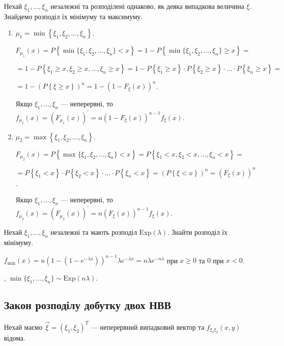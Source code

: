 Нехай $\xi_1, ..., \xi_n$ незалежні та розподілені однаково, як деяка випадкова величина $\xi$.
Знайдемо розподіл їх мінімуму та максимуму.
\begin{enumerate}
    \item $\mu_1 = \min\left\{\xi_1, \xi_2, ..., \xi_n\right\}$.

    $F_{\mu_1} (x) = P \left\{ \min\{\xi_1, \xi_2, ..., \xi_n\} < x \right\} =
    1 - P \left\{ \min\{\xi_1, \xi_2, ..., \xi_n\} \geq x \right\} =$

    $ = 1 - P \left\{ \xi_1 \geq x, \xi_2 \geq x, ..., \xi_n \geq x \right\} = 
    1 - P\left\{ \xi_1 \geq x\right\} \cdot P\left\{ \xi_2 \geq x\right\} \cdot ... \cdot P\left\{ \xi_n \geq x\right\} = $
    
    $ = 1 - (P\left\{ \xi \geq x\right\})^n = 1 - (1- F_\xi (x))^n$.

    Якщо $\xi_1, ..., \xi_n$ --- неперервні, то $f_{\mu_1} (x) = \left( F_{\mu_1} (x)\right)^\prime = n (1- F_\xi (x))^{n-1} f_\xi(x)$.
    \item $\mu_2 = \max\left\{\xi_1, \xi_2, ..., \xi_n\right\}$.

    $F_{\mu_2} (x) = P \left\{ \max\{\xi_1, \xi_2, ..., \xi_n\} < x \right\} =
    P \left\{ \xi_1 < x, \xi_2 < x, ..., \xi_n < x \right\} = $

    $ = P\left\{ \xi_1 < x\right\} \cdot P\left\{ \xi_2 < x\right\} \cdot ... \cdot P\left\{ \xi_n < x\right\} =
    (P\left\{ \xi < x\right\})^n = (F_\xi (x))^n$.

    Якщо $\xi_1, ..., \xi_n$ --- неперервні, то $f_{\mu_2} (x) = \left( F_{\mu_2} (x)\right)^\prime = n (F_\xi (x))^{n-1} f_\xi(x)$.
\end{enumerate}

\begin{example}
    Нехай $\xi_1, ..., \xi_n$ незалежні та мають розподіл $\mathrm{Exp}(\lambda)$. Знайти розподіл їх мінімуму.

    \noindent$f_{\min}(x) = n (1-(1-e^{-\lambda x}))^{n-1} \lambda e^{-\lambda x} = n \lambda e^{-n\lambda}$ при $x \geq 0$ та $0$ при $x < 0$.
    
    , $\min\{\xi_1, ..., \xi_n\} \sim \mathrm{Exp} (n \lambda)$.
\end{example}

\subsection{Закон розподілу добутку двох НВВ}
Нехай маємо $\vec{\xi} = (\xi_1, \xi_2)^T$ --- неперервний випадковий вектор та
$f_{\xi_1 \xi_2}(x, y)$ відома.

